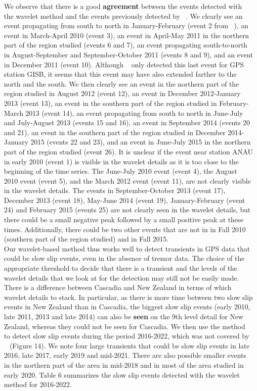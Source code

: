 \documentclass{article}
\begin{document}
We observe that there is a good \textbf{agreement} between the events detected with the wavelet method and the events previously detected by ~\citet{TOD_2016}. We clearly see an event propagating from south to north in January-February (event 2 from ~\citet{TOD_2016}), an event in March-April 2010 (event 3), an event in April-May 2011 in the northern part of the region studied (events 6 and 7), an event propagating south-to-north in August-September and September-October 2011 (events 8 and 9), and an event in December 2011 (event 10). Although ~\citet{TOD_2016} only detected this last event for GPS station GISB, it seems that this event may have also extended farther to the north and the south. We then clearly see an event in the northern part of the region studied in August 2012 (event 12), an event in December 2012-January 2013 (event 13), an event in the southern part of the region studied in February-March 2013 (event 14), an event propagating from south to north in June-July and July-August 2013 (events 15 and 16), an event in September 2014 (events 20 and 21), an event in the southern part of the region studied in December 2014-January 2015 (events 22 and 23), and an event in June-July 2015 in the northern part of the region studied (event 26). It is unclear if the event near station ANAU in early 2010 (event 1) is visible in the wavelet details as it is too close to the beginning of the time series. The June-July 2010 event (event 4), the August 2010 event (event 5), and the March 2012 event (event 11), are not clearly visible in the wavelet details. The events in September-October 2013 (event 17), December 2013 (event 18), May-June 2014 (event 19), January-February (event 24) and February 2015 (events 25) are not clearly seen in the wavelet details, but there could be a small negative peak followed by a small positive peak at these times. Additionally, there could be two other events that are not in \citep{TOD_2016} in Fall 2010 (southern part of the region studied) and in Fall 2015. \\

Our wavelet-based method thus works well to detect transients in GPS data that could be slow slip events, even in the absence of tremor data. The choice of the appropriate threshold to decide that there is a transient and the levels of the wavelet details that we look at for the detection may still not be easily made. There is a difference between Cascadia and New Zealand in terms of which wavelet details to stack. In particular, as there is more time between two slow slip events in New Zealand than in Cascadia, the biggest slow slip events (early 2010, late 2011, 2013 and late 2014) can also be \textbf{seen} on the 9th level detail for New Zealand, whereas they could not be seen for Cascadia. We then use the method to detect slow slip events during the period 2016-2022, which was not covered by ~\citet{TOD_2016} (Figure 14). We note four large transients that could be slow slip events in late 2016, late 2017, early 2019 and mid-2021. There are also possible smaller events in the northern part of the area in mid-2018 and in most of the area studied in early 2020. Table 6 summarizes the slow slip events detected with the wavelet method for 2016-2022. \\
\end{document}
